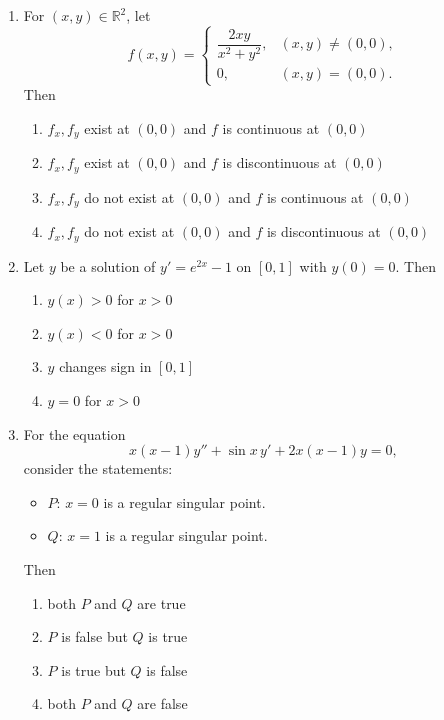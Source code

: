 \documentclass[journal]{IEEEtran}
\numberwithin{equation}{enumi}
\numberwithin{figure}{enumi}
\begin{document}
\begin{enumerate}
\item For \((x,y) \in \mathbb{R}^2\), let
\[
f(x,y) = \begin{cases}
\dfrac{2xy}{x^2 + y^2}, & (x,y) \neq (0,0), \\
0, & (x,y) = (0,0).
\end{cases}
\]
Then
\hfill{}
\begin{enumerate}
\item \(f_x, f_y\) exist at \((0,0)\) and \(f\) is continuous at \((0,0)\)
\item \(f_x, f_y\) exist at \((0,0)\) and \(f\) is discontinuous at \((0,0)\)
\item \(f_x, f_y\) do not exist at \((0,0)\) and \(f\) is continuous at \((0,0)\)
\item \(f_x, f_y\) do not exist at \((0,0)\) and \(f\) is discontinuous at \((0,0)\)
\end{enumerate}

\item Let \(y\) be a solution of \(y' = e^{2x} - 1\) on \([0,1]\) with \(y(0) = 0\). Then
\hfill{}
\begin{multicols}{2}
\begin{enumerate}
\item \(y(x) > 0\) for \(x > 0\)
\item \(y(x) < 0\) for \(x > 0\)
\item \(y\) changes sign in \([0,1]\)
\item \(y = 0\) for \(x > 0\)
\end{enumerate}
\end{multicols}

\item For the equation
\[
x(x-1) y'' + \sin x\, y' + 2 x(x-1) y = 0,
\]
consider the statements:
\begin{itemize}
  \item \(P\): \(x=0\) is a regular singular point.
  \item \(Q\): \(x=1\) is a regular singular point.
\end{itemize}
Then
\hfill{}
\begin{multicols}{2}
\begin{enumerate}
\item both \(P\) and \(Q\) are true
\item \(P\) is false but \(Q\) is true
\item \(P\) is true but \(Q\) is false
\item both \(P\) and \(Q\) are false
\end{enumerate}
\end{multicols}


\end{enumerate}
\end{document}
